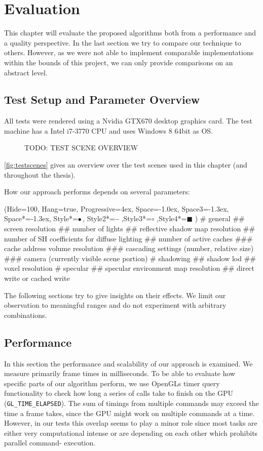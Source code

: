 \documentclass[thesis.tex]{subfiles}
\begin{document}
\chapter{Evaluation}\label{chap:eva}
This chapter will evaluate the proposed algorithms both from a performance and a quality perspective.
In the last section we try to compare our technique to others.
However, as we were not able to implement comparable implementations within the bounds of this project, we can only provide comparisons on an abstract level.

\section{Test Setup and Parameter Overview}
All tests were rendered using a Nvidia GTX670 desktop graphics card.
The test machine has a Intel i7-3770 CPU and uses Windows 8 64bit as OS.

\begin{figure}
\caption{TODO: TEST SCENE OVERVIEW}
\label{fig:testscenes}
\end{figure}
\autoref{fig:testscenes} gives an overview over the test scenes used in this chapter (and throughout the thesis).

How our approach performs depends on several parameters:
\begin{easylist}
\ListProperties(Hide=100, Hang=true, Progressive=4ex, Space=-1.0ex, Space3=-1.3ex, Space*=-1.3ex, Style*=$\bullet\,$,
Style2*=\textbf{--} ,Style3*=$\circ$ ,Style4*=\tiny$\blacksquare$ )
# general
## screen resolution
## number of lights
## reflective shadow map resolution
## number of SH coefficients for diffuse lighting
## number of active caches
### cache address volume resolution
### cascading settings (number, relative size)
### camera (currently visible scene portion)
# shadowing
## shadow lod
## voxel resolution
# specular
## specular environment map resolution
## direct write or cached write
\end{easylist}
The following sections try to give insights on their effects.
We limit our observation to meaningful ranges and do not experiment with arbitrary combinations.

\section{Performance}
In this section the performance and scalability of our approach is examined.
We measure primarily frame times in milliseconds.
To be able to evaluate how specific parts of our algorithm perform, we use OpenGLs timer query functionality to check how long a series of calls take to finish on the GPU (\texttt{GL\_TIME\_ELAPSED}).
The sum of timings from multiple commands may exceed the time a frame takes, since the GPU might work on multiple commands at a time.
However, in our tests this overlap seems to play a minor role since most tasks are either very computational intense or are depending on each other which prohibits parallel command- execution.
\end{document}

